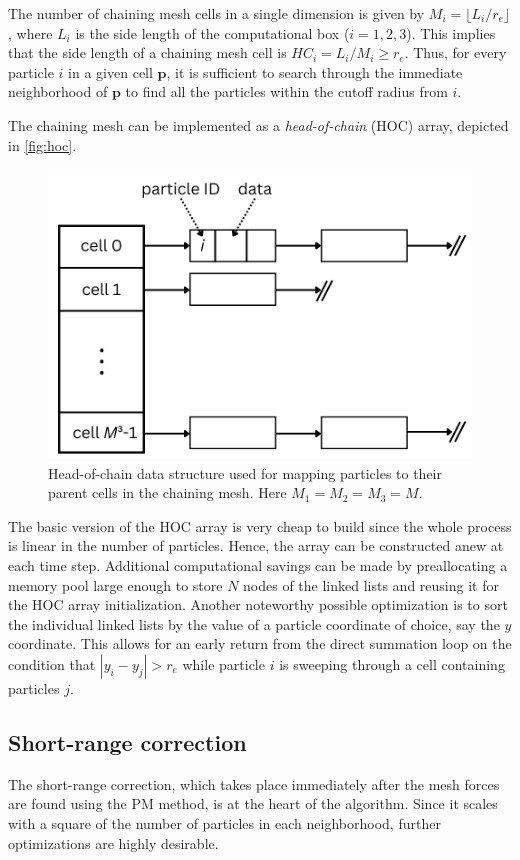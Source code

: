 The number of chaining mesh cells in a single dimension is given by $M_i = \lfloor L_i / r_e \rfloor$, where $L_i$ is the side length of the computational box ($i=1,2,3$).
This implies that the side length of a chaining mesh cell is $HC_i = L_i / M_i \geq r_e$.
Thus, for every particle $i$ in a given cell $\mathbf{p}$, it is sufficient to search through the immediate neighborhood of $\mathbf{p}$ to find all the particles within the cutoff radius from $i$.

The chaining mesh can be implemented as a \textit{head-of-chain} (HOC) array, depicted in \autoref{fig:hoc}.
\begin{figure}[htp]
    \centering
    \includegraphics[scale=0.25]{img/hoc.png}
    \caption{Head-of-chain data structure used for mapping particles to their parent cells in the chaining mesh.
        Here $M_1=M_2=M_3 = M$.}
    \label{fig:hoc}
\end{figure}
The basic version of the HOC array is very cheap to build since the whole process is linear in the number of particles.
Hence, the array can be constructed anew at each time step.
Additional computational savings can be made by preallocating a memory pool large enough to store $N$ nodes of the linked lists and reusing it for the HOC array initialization.
Another noteworthy possible optimization is to sort the individual linked lists by the value of a particle coordinate of choice, say the $y$ coordinate.
This allows for an early return from the direct summation loop on the condition that $|y_i - y_j| > r_e$ while particle $i$ is sweeping through a cell containing particles $j$.

\subsection{Short-range correction}
The short-range correction, which takes place immediately after the mesh forces are found using the PM method, is at the heart of the \PThreeM{} algorithm.
Since it scales with a square of the number of particles in each neighborhood, further optimizations are highly desirable.

